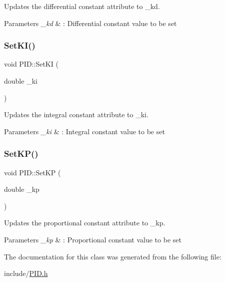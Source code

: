 Updates the differential constant attribute to \+\_\+kd. 


\begin{DoxyParams}{Parameters}
{\em \+\_\+kd} & \+: Differential constant value to be set \\
\hline
\end{DoxyParams}
\mbox{\label{classPID_af533c956b594242689fb74d758106937}} 
\subsubsection{\texorpdfstring{Set\+K\+I()}{SetKI()}}
{\footnotesize\ttfamily void P\+I\+D\+::\+Set\+KI (\begin{DoxyParamCaption}\item[{double}]{\+\_\+ki }\end{DoxyParamCaption})}



Updates the integral constant attribute to \+\_\+ki. 


\begin{DoxyParams}{Parameters}
{\em \+\_\+ki} & \+: Integral constant value to be set \\
\hline
\end{DoxyParams}
\mbox{\label{classPID_af0770e8c485faac734274e91692ec005}} 
\subsubsection{\texorpdfstring{Set\+K\+P()}{SetKP()}}
{\footnotesize\ttfamily void P\+I\+D\+::\+Set\+KP (\begin{DoxyParamCaption}\item[{double}]{\+\_\+kp }\end{DoxyParamCaption})}



Updates the proportional constant attribute to \+\_\+kp. 


\begin{DoxyParams}{Parameters}
{\em \+\_\+kp} & \+: Proportional constant value to be set \\
\hline
\end{DoxyParams}


The documentation for this class was generated from the following file\+:\begin{DoxyCompactItemize}
\item 
include/\hyperlink{PID_8h}{P\+I\+D.\+h}\end{DoxyCompactItemize}
